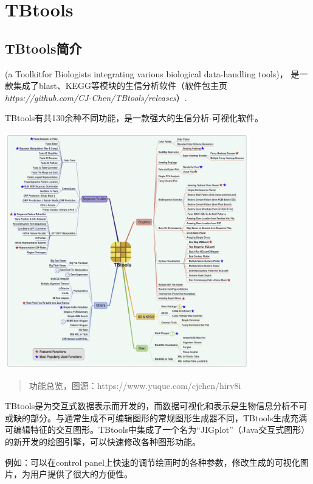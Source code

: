 \chapter{TBtools}

\section{TBtools简介}

(a Toolkitfor Biologists integrating various biological data-handling tools)，
是一款集成了blast、KEGG等模块的生信分析软件（软件包主页\textit{https://github.com/CJ-Chen/TBtools/releases}）.

TBtools有共130余种不同功能，是一款强大的生信分析-可视化软件。

\includegraphics[width=0.8\textwidth]{./image/gdk/8.1.1.png}

\begin{quotation}
    功能总览，图源：https://www.yuque.com/cjchen/hirv8i
\end{quotation}

TBtools是为交互式数据表示而开发的，而数据可视化和表示是生物信息分析不可或缺的部分。与通常生成不可编辑图形的常规图形生成器不同，TBtools生成充满可编辑特征的交互图形。TBtools中集成了一个名为“JIGplot”（Java交互式图形）的新开发的绘图引擎，可以快速修改各种图形功能。

例如：可以在control panel上快速的调节绘画时的各种参数，修改生成的可视化图片，为用户提供了很大的方便性。

